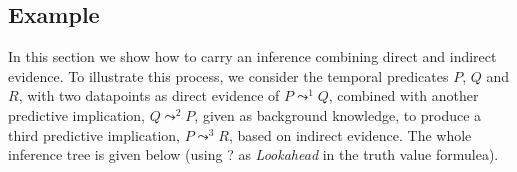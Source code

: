 \documentclass[runningheads]{llncs}
\newcommand{\TTV}{\textit{TV}}
\newcommand{\TTVP}{\textit{TV}^P}
\newcommand{\TTVQ}{\textit{TV}^Q}
\newcommand{\TTVR}{\textit{TV}^R}
\newcommand{\TTVPQ}{\textit{TV}^{PQ}}
\newcommand{\TTVQR}{\textit{TV}^{QR}}
\newcommand{\lpreimp}[1]{\leadsto^{#1}}
\newcommand{\ldo}[1]{\widehat{#1}}
\begin{document}
\subsection{Example}
In this section we show how to carry an inference combining direct and
indirect evidence.
To illustrate this process, we consider the temporal predicates $P$,
$Q$ and $R$, with two datapoints as direct evidence of
$P\lpreimp{1} Q$, combined with another predictive implication,
$Q\lpreimp{2} P$, given as background knowledge, to produce a third
predictive implication, $P\lpreimp{3}R$, based on indirect evidence.
The whole inference tree is given below (using ? as \emph{Lookahead}
in the truth value formulea).
\end{document}
